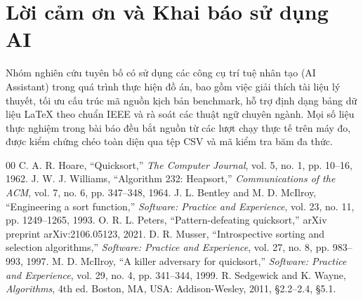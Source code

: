 \documentclass[conference]{IEEEtran}
\begin{document}
\section*{Lời cảm ơn và Khai báo sử dụng AI}
Nhóm nghiên cứu tuyên bố có sử dụng các công cụ trí tuệ nhân tạo (AI Assistant) trong quá trình thực hiện đồ án, bao gồm việc giải thích tài liệu lý thuyết, tối ưu cấu trúc mã nguồn kịch bản benchmark, hỗ trợ định dạng bảng dữ liệu LaTeX theo chuẩn IEEE và rà soát các thuật ngữ chuyên ngành. Mọi số liệu thực nghiệm trong bài báo đều bắt nguồn từ các lượt chạy thực tế trên máy đo, được kiểm chứng chéo toàn diện qua tệp CSV và mã kiểm tra băm đa thức.

\begin{thebibliography}{00}
 C. A. R. Hoare, ``Quicksort,'' \emph{The Computer Journal}, vol. 5, no. 1, pp. 10--16, 1962.
 J. W. J. Williams, ``Algorithm 232: Heapsort,'' \emph{Communications of the ACM}, vol. 7, no. 6, pp. 347--348, 1964.
 J. L. Bentley and M. D. McIlroy, ``Engineering a sort function,'' \emph{Software: Practice and Experience}, vol. 23, no. 11, pp. 1249--1265, 1993.
 O. R. L. Peters, ``Pattern-defeating quicksort,'' arXiv preprint arXiv:2106.05123, 2021.
 D. R. Musser, ``Introspective sorting and selection algorithms,'' \emph{Software: Practice and Experience}, vol. 27, no. 8, pp. 983--993, 1997.
 M. D. McIlroy, ``A killer adversary for quicksort,'' \emph{Software: Practice and Experience}, vol. 29, no. 4, pp. 341--344, 1999.
 R. Sedgewick and K. Wayne, \emph{Algorithms}, 4th ed. Boston, MA, USA: Addison-Wesley, 2011, \S2.2--2.4, \S5.1.
\end{thebibliography}
\end{document}
